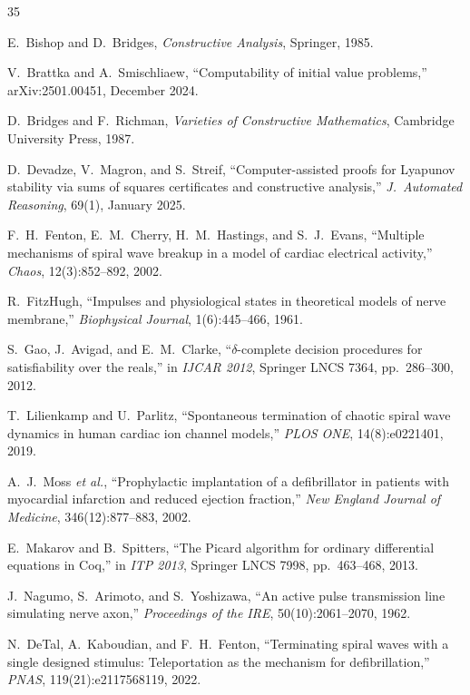 \documentclass[11pt,a4paper]{article}
\theoremstyle{plain}
\theoremstyle{definition}
\begin{document}
\begin{thebibliography}{35}

E.~Bishop and D.~Bridges,
\textit{Constructive Analysis},
Springer, 1985.

V.~Brattka and A.~Smischliaew,
``Computability of initial value problems,''
arXiv:2501.00451, December 2024.

D.~Bridges and F.~Richman,
\textit{Varieties of Constructive Mathematics},
Cambridge University Press, 1987.

D.~Devadze, V.~Magron, and S.~Streif,
``Computer-assisted proofs for Lyapunov stability via sums of squares certificates and constructive analysis,''
\textit{J.\ Automated Reasoning}, 69(1), January 2025.

F.~H.~Fenton, E.~M.~Cherry, H.~M.~Hastings, and S.~J.~Evans,
``Multiple mechanisms of spiral wave breakup in a model of cardiac electrical activity,''
\textit{Chaos}, 12(3):852--892, 2002.

R.~FitzHugh,
``Impulses and physiological states in theoretical models of nerve membrane,''
\textit{Biophysical Journal}, 1(6):445--466, 1961.

S.~Gao, J.~Avigad, and E.~M.~Clarke,
``$\delta$-complete decision procedures for satisfiability over the reals,''
in \textit{IJCAR 2012}, Springer LNCS 7364, pp.~286--300, 2012.

T.~Lilienkamp and U.~Parlitz,
``Spontaneous termination of chaotic spiral wave dynamics in human cardiac ion channel models,''
\textit{PLOS ONE}, 14(8):e0221401, 2019.

A.~J.~Moss \textit{et al.},
``Prophylactic implantation of a defibrillator in patients with myocardial infarction and reduced ejection fraction,''
\textit{New England Journal of Medicine}, 346(12):877--883, 2002.

E.~Makarov and B.~Spitters,
``The Picard algorithm for ordinary differential equations in Coq,''
in \textit{ITP 2013}, Springer LNCS 7998, pp.~463--468, 2013.

J.~Nagumo, S.~Arimoto, and S.~Yoshizawa,
``An active pulse transmission line simulating nerve axon,''
\textit{Proceedings of the IRE}, 50(10):2061--2070, 1962.

N.~DeTal, A.~Kaboudian, and F.~H.~Fenton,
``Terminating spiral waves with a single designed stimulus: Teleportation as the mechanism for defibrillation,''
\textit{PNAS}, 119(21):e2117568119, 2022.


\end{thebibliography}
\end{document}
